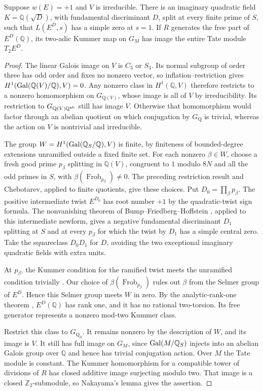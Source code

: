 \documentclass[11pt]{article}
\newcommand{\Q}{\mathbb Q}\newcommand{\Z}{\mathbb Z}\newcommand{\F}{\mathbb F}
\begin{document}
\begin{lem}\label{free}
Suppose $w(E)=+1$ and $V$ is irreducible. There is an imaginary
quadratic field $K=\Q(\sqrt D)$, with fundamental discriminant $D$,
split at every finite prime of $S$, such that $L(E^D,s)$ has a
simple zero at $s=1$. If $R$ generates the free part of
$E^D(\Q)$, its two-adic Kummer map on $G_M$ has image the entire
Tate module $T_2E^D$.
\end{lem}
\begin{proof}
The linear Galois image on $V$ is $C_3$ or $S_3$. Its normal
subgroup of order three has odd order and fixes no nonzero vector,
so inflation--restriction gives $H^1(\Gal(\Q(V)/\Q),V)=0$.
Any nonzero class in $H^1(\Q,V)$ therefore restricts to a nonzero
homomorphism on $G_{\mathrm Q(V)}$, whose image is all of $V$ by
irreducibility. Its restriction to $G_{\mathrm Q(V)\Q^{\rm ab}}$ still has
image $V$. Otherwise that homomorphism would factor through an abelian
quotient on which conjugation by $G_{\mathrm Q}$ is trivial, whereas the action
on $V$ is nontrivial and irreducible.

The group $W=H^1(\Gal(\Q_S/\Q),V)$ is finite, by finiteness of
bounded-degree extensions unramified outside a fixed finite set.
For each nonzero $\beta\in W$, choose a fresh good prime $p_\beta$
splitting in $\Q(V)$, congruent to $1$ modulo $8N$ and all the odd
primes in $S$, with $\beta(\operatorname{Frob}_{p_\beta})\ne0$.
The preceding restriction result and Chebotarev, applied to finite
quotients, give these choices. Put $D_0=\prod_\beta p_\beta$.
The positive intermediate twist $E^{D_0}$ has root number $+1$ by
the quadratic-twist sign formula. The nonvanishing theorem of
Bump--Friedberg--Hoffstein \cite{BFH}, applied to this intermediate
newform, gives a negative fundamental discriminant $D_1$ splitting
at $S$ and at every $p_\beta$ for which the twist by $D_1$ has a
simple central zero. Take the squareclass $D_0D_1$ for $D$, avoiding
the two exceptional imaginary quadratic fields with extra units.

At $p_\beta$, the Kummer condition for the ramified twist meets the
unramified condition trivially \cite[Lemmas 2.9--2.11]{MR}.
Our choice of $\beta(\operatorname{Frob}_{p_\beta})$ rules out
$\beta$ from the Selmer group of $E^D$. Hence this Selmer group
meets $W$ in zero. By the analytic-rank-one theorem \cite{Wiles},
$E^D(\Q)$ has rank one, and it has no rational two-torsion.
Its free generator represents a nonzero mod-two Kummer class.

Restrict this class to $G_{\mathrm Q_S}$. It remains nonzero by the
description of $W$, and its image is $V$. It still has full image
on $G_M$, since $\Gal(M/\Q_S)$ injects into an abelian Galois
group over $\Q$ and hence has trivial conjugation action. Over $M$
the Tate module is constant. The Kummer homomorphism for a compatible
tower of divisions of $R$ has closed additive image surjecting modulo
two. That image is a closed $\Z_2$-submodule, so Nakayama's lemma
gives the assertion.
\end{proof}
\end{document}
